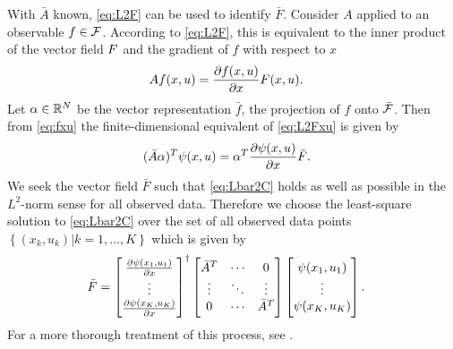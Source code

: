 With $\bar{A}$ known, \eqref{eq:L2F} can be used to identify $\bar{F}$.
Consider $A$ applied to an observable $f \in \mathcal{F}$.
According to \eqref{eq:L2F}, this is equivalent to the inner product of the vector field $F$ and the gradient of ${f}$ with respect to $x$  
\begin{align}
    A f(x,u) &= \frac{\partial f(x,u)}{\partial x} F(x,u).
    \label{eq:L2Fxu}
\end{align}
Let $\alpha \in \mathbb{R}^N$ be the vector representation $\bar{f}$, the projection of ${f}$ onto $\bar{\mathcal{F}}$.
Then from \eqref{eq:fxu} the finite-dimensional equivalent of \eqref{eq:L2Fxu} is given by
\begin{align}
    (\bar{A} {\alpha})^T {\psi}(x,u) &= {\alpha}^T \frac{\partial \psi(x, u)}{\partial x} \bar{F}.
    \label{eq:Lbar2C}
\end{align}
We seek the vector field $\bar{F}$ such that \eqref{eq:Lbar2C} holds as well as possible in the $L^2$-norm sense for all observed data.
Therefore we choose the least-square solution to \eqref{eq:Lbar2C} over the set of all observed data points $\left\{ (x_k,u_k) | k = 1,...,K \right\}$ which is given by
\begin{align}
    \bar{F} &= \begin{bmatrix}  \frac{\partial \psi(x_1, u_1)}{\partial x} \\ \vdots \\ \frac{\partial \psi(x_K, u_K)}{\partial x}  \end{bmatrix}^\dagger
    \begin{bmatrix}  \bar{A}^T & \cdots & 0 \\ \vdots & \ddots & \vdots \\ 0 & \cdots & \bar{A}^T  \end{bmatrix}
    \begin{bmatrix}  \psi(x_1,u_1) \\ \vdots \\ \psi(x_K,u_K)  \end{bmatrix}.
    \label{eq:Fbar}
\end{align}
For a more thorough treatment of this process, see \cite{mauroy2016linear, mauroy2017koopman}.